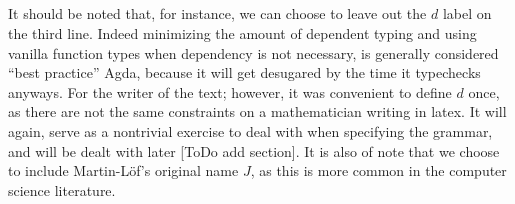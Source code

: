 \begin{code}%
\>[0]\<%
\\
\>[0][@{}l@{\AgdaIndent{1}}]%
\>[2]\AgdaSpace{}%
\AgdaSymbol{:}%
\>[46I]\AgdaSymbol{\{}\AgdaSpace{}%
\AgdaSymbol{:}\AgdaSpace{}%
\AgdaSymbol{\}}\<%
\\
\>[.][@{}l@{}]\<[46I]%
\>[6]\AgdaSpace{}%
\AgdaSymbol{(}\AgdaSpace{}%
\AgdaSymbol{:}\AgdaSpace{}%
\AgdaSymbol{(}\AgdaSpace{}%
\AgdaSpace{}%
\AgdaSymbol{:}\AgdaSpace{}%
\AgdaSymbol{)}\AgdaSpace{}%
\AgdaSpace{}%
\AgdaSymbol{(}\AgdaSpace{}%
\AgdaSpace{}%
\AgdaSymbol{)}\AgdaSpace{}%
%
\>[36]\AgdaSymbol{)}\<%
\\
%
\>[6]\AgdaSpace{}%
\AgdaSymbol{((}\AgdaSpace{}%
\AgdaSymbol{:}\AgdaSpace{}%
\AgdaSymbol{)}\AgdaSpace{}%
\AgdaSpace{}%
\AgdaSymbol{(}\AgdaSpace{}%
\AgdaSpace{}%
\AgdaSpace{}%
\AgdaSpace{}%
\AgdaSymbol{))}\AgdaSpace{}%
\<%
\\
%
\>[6]\AgdaSpace{}%
\AgdaSymbol{(}\AgdaSpace{}%
\AgdaSpace{}%
\AgdaSymbol{:}\AgdaSpace{}%
\AgdaSymbol{)}\<%
\\
%
\>[6]\AgdaSpace{}%
\AgdaSymbol{(}\AgdaSpace{}%
\AgdaSymbol{:}\AgdaSpace{}%
\AgdaSpace{}%
\AgdaSpace{}%
\AgdaSymbol{)}\<%
\\
%
\>[6]\AgdaComment{------------------------------------}\<%
\\
%
\>[6]\AgdaSpace{}%
\AgdaSpace{}%
\AgdaSpace{}%
\AgdaSpace{}%
\<%
\\
%
\>[2]\AgdaSpace{}%
\AgdaSpace{}%
\AgdaSpace{}%
\AgdaSpace{}%
\AgdaSpace{}%
\AgdaSpace{}%
\AgdaSymbol{=}\AgdaSpace{}%
\AgdaSpace{}%
\<%
\\
\>[0]\<%
\end{code}

It should be noted that, for instance, we can choose to leave out the $d$ label
on the third line. Indeed minimizing the amount of dependent typing and using
vanilla function types when dependency is not necessary, is generally
considered ``best practice'' Agda, because it will get desugared by the time it
typechecks anyways. For the writer of the text; however, it was convenient to
define $d$ once, as there are not the same constraints on a mathematician
writing in latex. It will again, serve as a nontrivial exercise to deal with
when specifying the grammar, and will be dealt with later [ToDo add section].
It is also of note that we choose to include Martin-Löf's original name $J$, as
this is more common in the computer science literature.

